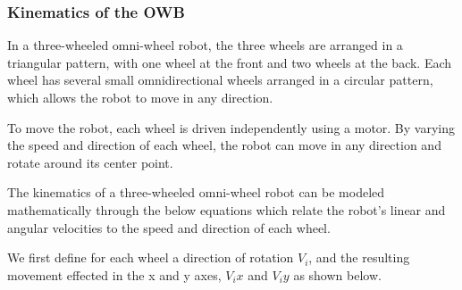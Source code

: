 \documentclass[journal,onecolumn, draftclsnofoot, 12pt]{IEEEtran}
\begin{document}
\subsubsection{Kinematics of the OWB}
\label{sec:OWBKinematics}
In a three-wheeled omni-wheel robot, the three wheels are arranged in a triangular pattern, with one wheel at the front and two wheels at the back. Each wheel has several small omnidirectional wheels arranged in a circular pattern, which allows the robot to move in any direction.

To move the robot, each wheel is driven independently using a motor. By varying the speed and direction of each wheel, the robot can move in any direction and rotate around its center point.

The kinematics of a three-wheeled omni-wheel robot can be modeled mathematically through the below equations \cite{riky2021omnidirectional} which relate the robot's linear and angular velocities to the speed and direction of each wheel.

We first define for each wheel a direction of rotation $V_i$, and the resulting movement effected in the x and y axes, $V_ix$ and $V_iy$ as shown below.
\end{document}
